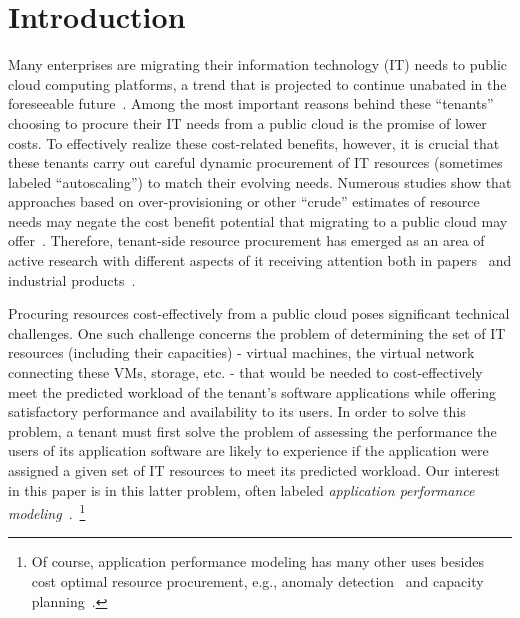\section{Introduction}
\vspace{10pt}


Many enterprises are migrating their information technology (IT) needs to public cloud computing platforms, a trend that is projected to continue unabated in the foreseeable future~\cite{forbes}. Among the most important reasons behind these ``tenants'' choosing to procure their IT needs from a public cloud is the promise of lower costs. To effectively realize these cost-related benefits, however, it is crucial that these tenants carry out careful dynamic procurement of IT resources (sometimes labeled ``autoscaling'') to match their evolving needs. Numerous studies show that approaches based on over-provisioning or other ``crude'' estimates of resource needs may negate the cost benefit potential that migrating to a public cloud may offer~\cite{takmig,Li2011,Teregowda10a,Teregowda10b}. Therefore, tenant-side resource procurement has emerged as an area of active research with different aspects of it receiving attention both in  papers~\cite{WuBPKM13,Zafer2012OBS,MenacheSJ14,Zhang15,Farley:2012:MYM:2391229.2391249,DBLP:conf/hotcloud/LeeK11} and industrial products~\cite{cloudphysics,clusterk}. 

Procuring resources cost-effectively from a public cloud %
poses significant technical challenges. One such challenge concerns the problem of determining the set of IT resources (including their capacities) - virtual machines, the virtual network connecting these VMs, storage, etc. - that would be needed to cost-effectively meet the predicted workload of the tenant's software applications while offering satisfactory performance and availability to its users. In order to solve this problem, a tenant must first solve the problem of assessing the performance the users of its application software are likely to experience if the application were assigned a given set of IT resources to meet its predicted workload. Our interest in this paper is in this latter problem, often labeled {\it application performance modeling}~\cite{DBLP:journals/internet/Menasce04,sigmetrics05,Stewart07,SchroederWH06,MiCCS10,ZhangCL14,DBLP:journals/debu/HerodotouB13,DBLP:conf/cmg/MenasceB12}.~\footnote{Of course, application performance modeling has many other uses besides cost optimal resource procurement, e.g., anomaly detection~\cite{Kelly:2005:DPA:1251522.1251530,Cohen:2004:CID:1251254.1251270} and capacity planning~\cite{DBLP:conf/cmg/MenasceN09}.} 

